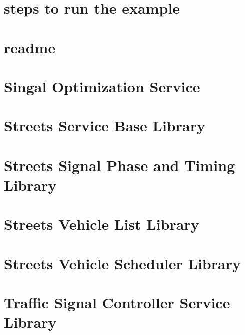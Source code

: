 \let\mypdfximage\pdfximage\def\pdfximage{\immediate\mypdfximage}\documentclass[twoside]{book}
\newcommand{\+}{\discretionary{\mbox{\scriptsize$\hookleftarrow$}}{}{}}
\begin{document}
\chapter{steps to run the example}
\label{md_scheduling_service_readme}

\chapter{readme}
\label{md_scripts_readme}

\chapter{Singal Optimization Service}
\label{md_signal_opt_service_readme}

\chapter{Streets Service Base Library}
\label{md_streets_utils_streets_service_base_README}

\chapter{Streets Signal Phase and Timing Library}
\label{md_streets_utils_streets_signal_phase_and_timing_README}

\chapter{Streets Vehicle List Library}
\label{md_streets_utils_streets_vehicle_list_README}

\chapter{Streets Vehicle Scheduler Library}
\label{md_streets_utils_streets_vehicle_scheduler_README}

\chapter{Traffic Signal Controller Service Library}
\label{md_tsc_client_service_README}

\end{document}
